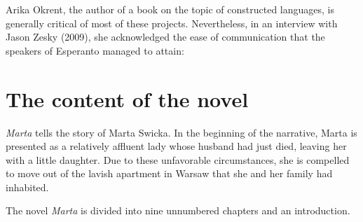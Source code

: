 Arika Okrent, the author of a book on the topic of constructed languages, is generally critical of most of these projects.
Nevertheless, in an interview with Jason Zesky (2009), she acknowledged the ease of communication that the speakers of Esperanto managed to attain:


\section{The content of the novel}
\textit{Marta} tells the story of Marta Swicka.
In the beginning of the narrative, Marta is presented as a relatively affluent lady whose husband had just died, leaving her with a little daughter. %
Due to these unfavorable circumstances, she is compelled to move out of the lavish apartment in Warsaw that she and her family had inhabited.

The novel \textit{Marta} is divided into nine unnumbered chapters and an introduction. 